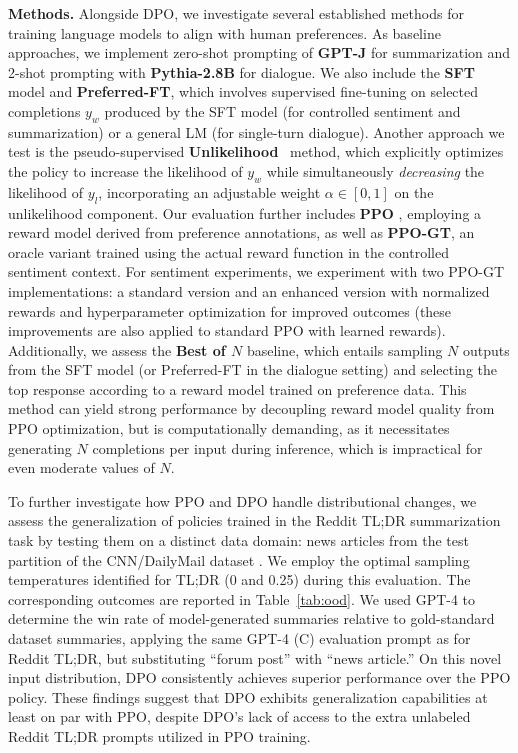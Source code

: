 \textbf{Methods.} Alongside DPO, we investigate several established methods for training language models to align with human preferences. As baseline approaches, we implement zero-shot prompting of \textbf{GPT-J} \citep{gpt-j} for summarization and 2-shot prompting with \textbf{Pythia-2.8B} \citep{biderman2023pythia} for dialogue. We also include the \textbf{SFT} model and \textbf{Preferred-FT}, which involves supervised fine-tuning on selected completions $y_w$ produced by the SFT model (for controlled sentiment and summarization) or a general LM (for single-turn dialogue). Another approach we test is the pseudo-supervised \textbf{Unlikelihood}~\citep{welleck2019neural} method, which explicitly optimizes the policy to increase the likelihood of $y_w$ while simultaneously \textit{decreasing} the likelihood of $y_l$, incorporating an adjustable weight $\alpha\in[0,1]$ on the unlikelihood component. Our evaluation further includes \textbf{PPO} \citep{schulman2017proximal}, employing a reward model derived from preference annotations, as well as \textbf{PPO-GT}, an oracle variant trained using the actual reward function in the controlled sentiment context. For sentiment experiments, we experiment with two PPO-GT implementations: a standard version \cite{leandro_von_werra_2023_7790115} and an enhanced version with normalized rewards and hyperparameter optimization for improved outcomes (these improvements are also applied to standard PPO with learned rewards). Additionally, we assess the \textbf{Best of $N$} baseline, which entails sampling $N$ outputs from the SFT model (or Preferred-FT in the dialogue setting) and selecting the top response according to a reward model trained on preference data. This method can yield strong performance by decoupling reward model quality from PPO optimization, but is computationally demanding, as it necessitates generating $N$ completions per input during inference, which is impractical for even moderate values of $N$.



To further investigate how PPO and DPO handle distributional changes, we assess the generalization of policies trained in the Reddit TL;DR summarization task by testing them on a distinct data domain: news articles from the test partition of the CNN/DailyMail dataset \citep{nallapati-etal-2016-abstractive}. We employ the optimal sampling temperatures identified for TL;DR (0 and 0.25) during this evaluation. The corresponding outcomes are reported in Table~\ref{tab:ood}. We used GPT-4 to determine the win rate of model-generated summaries relative to gold-standard dataset summaries, applying the same GPT-4 (C) evaluation prompt as for Reddit TL;DR, but substituting “forum post” with “news article.” On this novel input distribution, DPO consistently achieves superior performance over the PPO policy. These findings suggest that DPO exhibits generalization capabilities at least on par with PPO, despite DPO’s lack of access to the extra unlabeled Reddit TL;DR prompts utilized in PPO training.

